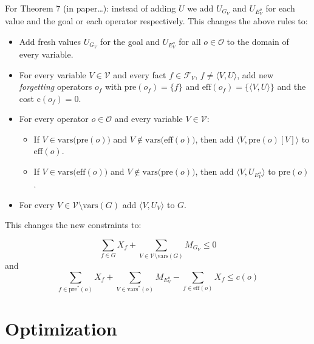 For Theorem 7 (in paper\dots):
instead of adding $U$ we add $U_{G_V}$ and $U_{E_V^o}$ for each value and the goal or each operator respectively.
This changes the above rules to:
\begin{itemize}
    \item Add fresh values $U_{G_V}$ for the goal and $U_{E_V^o}$ for all $o\in\mathcal{O}$ to the domain of every variable.
    \item For every variable $V\in\mathcal{V}$ and every fact $f\in\mathcal{F}_V$, $f\neq\langle V,U\rangle$, add new \textit{forgetting} operators $o_f$ with $\text{pre}(o_f)=\{f\}$ and $\text{eff}(o_f)=\{\langle V,U\rangle\}$ and the cost $\text{c}(o_f)=0$. 
    \item For every operator $o\in\mathcal{O}$ and every variable $V\in\mathcal{V}$:
    \begin{itemize}
        \item If $V\in\text{vars(pre}(o))$ and $V\notin\text{vars(eff}(o))$, then add $\langle V,\text{pre}(o)[V]\rangle$ to $\text{eff}(o)$.
        \item If $V\in\text{vars(eff}(o))$ and $V\notin\text{vars(pre}(o))$, then add $\langle V,U_{E^o_V}\rangle$ to $\text{pre}(o)$.
    \end{itemize}
    \item For every $V\in\mathcal{V}\setminus\text{vars}(G)$ add $\langle V,U_V\rangle$ to $G$.
\end{itemize}

This changes the new constraints to:

\[\sum_{f\in G}X_f+\sum_{V\in\mathcal{V}\setminus\text{vars}(G)}M_{G_V}\leq0\tag{i}\]
and
\[\sum_{f\in\text{pre}^*(o)}X_f+\sum_{V\in\text{vars}^*(o)}M_{E^o_V}-\sum_{f\in\text{eff}(o)}X_f\leq c(o)\tag{ii}\]




\begin{comment}
    \begin{definition}
        Let $f$ be a solution to the following LP:
        Maximize $\mathrm{opt}$ subject to $\sum_{V\in\mathcal{V}}\mathtt{P}_{\langle V, s[V]\rangle}\leq0$ and
        $\sum_{V\in\mathrm{vars(eff}(o))}(\mathtt{P}_{\langle V, \mathrm{pre}(o)[V]\rangle}-\mathtt{P}_{\langle V, \mathrm{eff}(o)[V]\rangle})\leq\mathrm{c}(o)$
        for all $o\in\mathcal{O}$, where the objective function $\athrm{opt}$ can be chosen arbitrarily.
        Then the function $\mathrm{pot}_{\mathrm{opt}}(\langle V,v\rangle)=f()$
    \end{definition}
\end{comment}


\section{Optimization}\label{sec:optimization}


